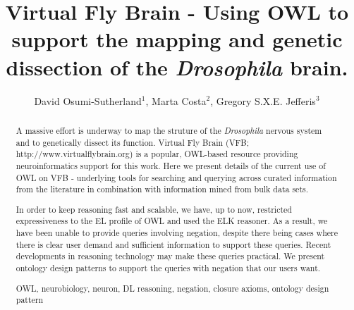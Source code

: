 \documentclass[runningheads,a4paper]{llncs}
\newcommand{\keywords}[1]{\par\addvspace\baselineskip
\noindent\keywordname\enspace\ignorespaces#1}
\begin{document}
\mainmatter  %

\title{Virtual Fly Brain - Using OWL to support the mapping and
  genetic dissection of the \textit{Drosophila} brain.}


%
%
\author{David Osumi-Sutherland$^1$, Marta Costa$^2$, Gregory S.X.E. Jefferis$^3$}

%


%
%

\toctitle{}
\tocauthor{}
\maketitle


\begin{abstract}
A massive effort is underway to map the struture of the \textit{Drosophila}
nervous system and to genetically dissect its function. Virtual Fly
Brain (VFB; http://www.virtualflybrain.org) is a popular, OWL-based resource
providing neuroinformatics support for this work.  Here we present
details of the current use of OWL on VFB  - underlying tools for
searching and querying across curated information from the literature
in combination with information mined from bulk data sets.

In order to keep reasoning fast and scalable, we have, up to now, restricted
expressiveness to the EL profile of OWL and used the ELK reasoner. As a result,
we have been unable to provide queries involving negation, despite
there being cases where there is clear
user demand and sufficient information to support these
queries. Recent developments in reasoning technology may
make these queries practical. We present ontology design patterns to
support the queries with negation that our users want.

\keywords{OWL, neurobiology, neuron, DL reasoning, negation, closure
  axioms, ontology design pattern}
\end{abstract}
\end{document}
